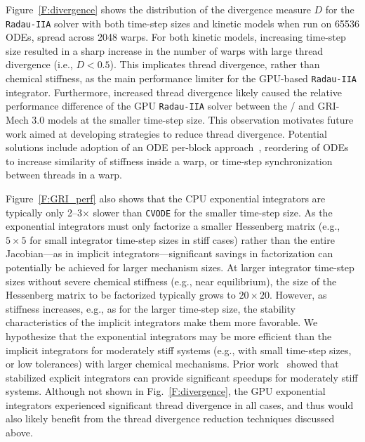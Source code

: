 \documentclass[final,twocolumn]{elsarticle}
\begin{document}
Figure~\ref{F:divergence} shows the distribution of the divergence measure $D$ for the \texttt{Radau-IIA} solver with both time-step sizes and kinetic models when run on \num{65536} ODEs, spread across \num{2048} warps.
For both kinetic models, increasing time-step size resulted in a sharp increase in the number of warps with large thread divergence (i.e., $D < 0.5$).
This implicates thread divergence, rather than chemical stiffness, as the main performance limiter for the GPU-based \texttt{Radau-IIA} integrator.
Furthermore, increased thread divergence likely caused the relative performance difference of the GPU \texttt{Radau-IIA} solver between the \slash{} and GRI-Mech 3.0 models at the smaller time-step size.
This observation motivates future work aimed at developing strategies to reduce thread divergence.
Potential solutions include adoption of an ODE per-block approach~\cite{Stone:2013aa}, reordering of ODEs to increase similarity of stiffness inside a warp, or time-step synchronization between threads in a warp.

Figure~\ref{F:GRI_perf} also shows that the CPU exponential integrators are typically only \numrange{2}{3}$\times$ slower than \texttt{CVODE} for the smaller time-step size.
As the exponential integrators must only factorize a smaller Hessenberg matrix (e.g., $5 \times 5$ for small integrator time-step sizes in stiff cases) rather than the entire Jacobian---as in implicit integrators---significant savings in factorization can potentially be achieved for larger mechanism sizes.
At larger integrator time-step sizes without severe chemical stiffness (e.g., near equilibrium), the size of the Hessenberg matrix to be factorized typically grows to $20\times 20$.
However, as stiffness increases, e.g., as for the larger time-step size, the stability characteristics of the implicit integrators make them more favorable.
We hypothesize that the exponential integrators may be more efficient than the implicit integrators for moderately stiff systems (e.g., with small time-step sizes, or low tolerances) with larger chemical mechanisms.
Prior work~\cite{Niemeyer:2014aa} showed that stabilized explicit integrators can provide significant speedups for moderately stiff systems.
Although not shown in Fig.~\ref{F:divergence}, the GPU exponential integrators experienced significant thread divergence in all cases, and thus would also likely benefit from the thread divergence reduction techniques discussed above.
\end{document}
